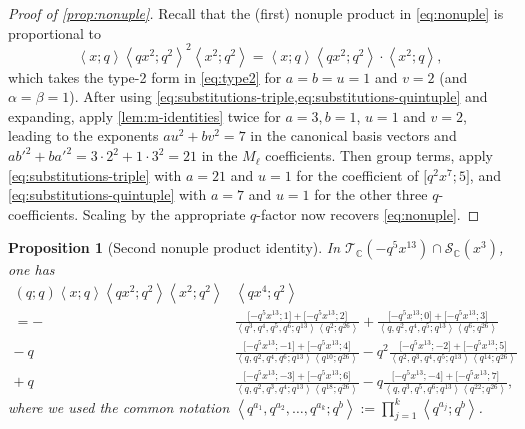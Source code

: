 \documentclass[reqno,11pt]{amsart}
\newtheorem{proposition}[theorem]{Proposition}
\theoremstyle{definition}
\theoremstyle{remark}
\numberwithin{equation}{section}
\newcommand{\C}{\mathbb{C}}
\newcommand{\mT}{\mathcal{T}}
\newcommand{\mS}{\mathcal{S}}
\newcommand{\la}{\left\langle}
\newcommand{\ra}{\right\rangle}
\newcommand{\vect}[2]{\big[{#1};{#2}\big]}
\begin{document}
\begin{proof}[Proof of \cref{prop:nonuple}]
Recall that the (first) nonuple product in \cref{eq:nonuple} is proportional to
\[
    \la x; q \ra \la qx^2; q^2 \ra^2 \la x^2; q^2 \ra 
    =
    \la x; q \ra \la qx^2; q^2 \ra \cdot \la x^2; q \ra,
\]
which takes the type-2 form in \cref{eq:type2} for $a = b = u = 1$ and $v = 2$ (and $\alpha = \beta = 1$). After using \cref{eq:substitutions-triple,eq:substitutions-quintuple} and expanding, apply \cref{lem:m-identities} twice for $a = 3, b = 1$, $u = 1$ and $v = 2$, leading to the exponents $au^2 + bv^2 = 7$ in the canonical basis vectors and $ab'^2 + ba'^2 = 3 \cdot 2^2 + 1 \cdot 3^2 = 21$ in the $M_\ell$ coefficients. Then group terms, apply \cref{eq:substitutions-triple} with $a = 21$ and $u = 1$ for the coefficient of $\vect{q^2x^7}{5}$, and \cref{eq:substitutions-quintuple} with $a = 7$ and $u = 1$ for the other three $q$-coefficients. Scaling by the appropriate $q$-factor now recovers \cref{eq:nonuple}.
\end{proof}
\begin{proposition}[Second nonuple product identity] \label{prop:nonuple2}
In $\mT_\C\left(-q^5 x^{13}\right) \cap \mS_\C\left(x^3\right)$, one has
\begin{equation} \label{eq:nonuple2}
\begin{aligned}
    (q; q)\la x; q \ra \la qx^2; q^2 \ra \la x^2; q^2 \ra &\la qx^4; q^2 \ra
    \\
    =
    -&\frac{\vect{-q^5x^{13}}{1} + \vect{-q^5x^{13}}{2}}{\la q^3,q^4,q^5,q^6 ; q^{13}\ra \la q^2 ; q^{26} \ra}
    +
    \frac{\vect{-q^5x^{13}}{0} + \vect{-q^5x^{13}}{3}}{\la q,q^2,q^4,q^5 ; q^{13}\ra \la q^6 ; q^{26} \ra}
    \\[7pt]
    -\ q&\frac{\vect{-q^5x^{13}}{-1} + \vect{-q^5x^{13}}{4}}{\la q,q^2,q^4,q^6 ; q^{13}\ra \la q^{10} ; q^{26} \ra}
    -q^2
    \frac{\vect{-q^5x^{13}}{-2} + \vect{-q^5x^{13}}{5}}{\la q^2,q^3,q^4,q^5 ; q^{13}\ra \la q^{14} ; q^{26} \ra}
    \\[7pt]
    +\ q&\frac{\vect{-q^5x^{13}}{-3} + \vect{-q^5x^{13}}{6}}{\la q,q^2,q^3,q^4 ; q^{13}\ra \la q^{18} ; q^{26} \ra}
    -q
    \frac{\vect{-q^5x^{13}}{-4} + \vect{-q^5x^{13}}{7}}{\la q,q^3,q^5,q^6 ; q^{13}\ra \la q^{22} ; q^{26} \ra},
\end{aligned}
\end{equation}
where we used the common notation $\la q^{a_1}, q^{a_2}, \ldots, q^{a_k}; q^b \ra := \prod_{j=1}^k \la q^{a_j}; q^b \ra$.
\end{proposition}
\end{document}
